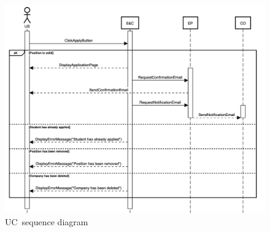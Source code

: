\begin{figure}[h]
    \centering
    \includegraphics[width=16cm]{images/sequence-diagrams/student-applies-for-position.png}
    \caption{UC\theuc\ sequence diagram}
\end{figure}



